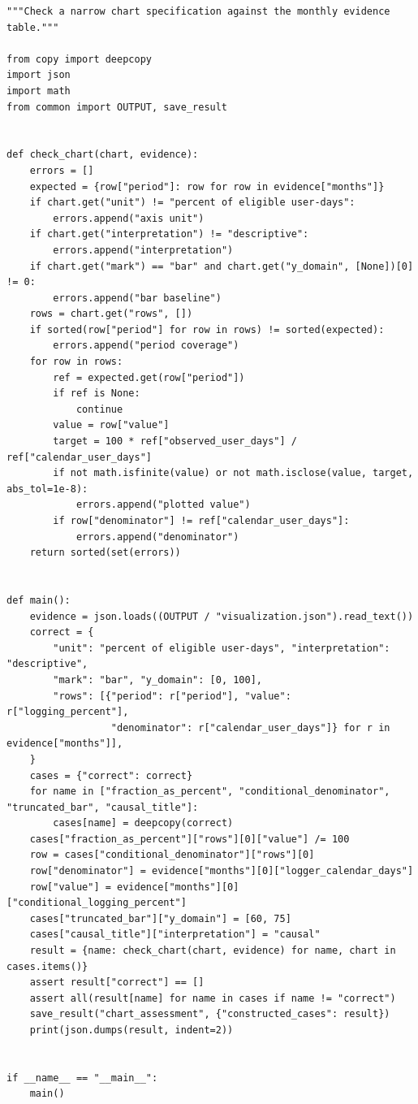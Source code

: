 \begin{Verbatim}[breaklines,breakanywhere,fontsize=\small]
"""Check a narrow chart specification against the monthly evidence table."""

from copy import deepcopy
import json
import math
from common import OUTPUT, save_result


def check_chart(chart, evidence):
    errors = []
    expected = {row["period"]: row for row in evidence["months"]}
    if chart.get("unit") != "percent of eligible user-days":
        errors.append("axis unit")
    if chart.get("interpretation") != "descriptive":
        errors.append("interpretation")
    if chart.get("mark") == "bar" and chart.get("y_domain", [None])[0] != 0:
        errors.append("bar baseline")
    rows = chart.get("rows", [])
    if sorted(row["period"] for row in rows) != sorted(expected):
        errors.append("period coverage")
    for row in rows:
        ref = expected.get(row["period"])
        if ref is None:
            continue
        value = row["value"]
        target = 100 * ref["observed_user_days"] / ref["calendar_user_days"]
        if not math.isfinite(value) or not math.isclose(value, target, abs_tol=1e-8):
            errors.append("plotted value")
        if row["denominator"] != ref["calendar_user_days"]:
            errors.append("denominator")
    return sorted(set(errors))


def main():
    evidence = json.loads((OUTPUT / "visualization.json").read_text())
    correct = {
        "unit": "percent of eligible user-days", "interpretation": "descriptive",
        "mark": "bar", "y_domain": [0, 100],
        "rows": [{"period": r["period"], "value": r["logging_percent"],
                  "denominator": r["calendar_user_days"]} for r in evidence["months"]],
    }
    cases = {"correct": correct}
    for name in ["fraction_as_percent", "conditional_denominator", "truncated_bar", "causal_title"]:
        cases[name] = deepcopy(correct)
    cases["fraction_as_percent"]["rows"][0]["value"] /= 100
    row = cases["conditional_denominator"]["rows"][0]
    row["denominator"] = evidence["months"][0]["logger_calendar_days"]
    row["value"] = evidence["months"][0]["conditional_logging_percent"]
    cases["truncated_bar"]["y_domain"] = [60, 75]
    cases["causal_title"]["interpretation"] = "causal"
    result = {name: check_chart(chart, evidence) for name, chart in cases.items()}
    assert result["correct"] == []
    assert all(result[name] for name in cases if name != "correct")
    save_result("chart_assessment", {"constructed_cases": result})
    print(json.dumps(result, indent=2))


if __name__ == "__main__":
    main()
\end{Verbatim}

